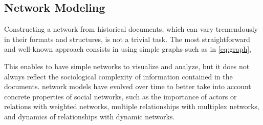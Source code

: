 

\subsection{Network Modeling}\label{subsec:network-modeling}

Constructing a network from historical documents, which can vary tremendously in their formats and structures, is not a trivial task\cite{alkadi2022}.
The most straightforward and well-known approach consists in using simple graphs such as in \autoref{eq:graph}, 

This enables to have simple networks to visualize and analyze, but it does not always reflect the sociological complexity of information contained in the documents.
\hsna network models have evolved over time to better take into account concrete properties of social networks, such as the importance of actors or relations with weighted networks, multiple relationships with multiplex networks, and dynamics of relationships with dynamic networks.

